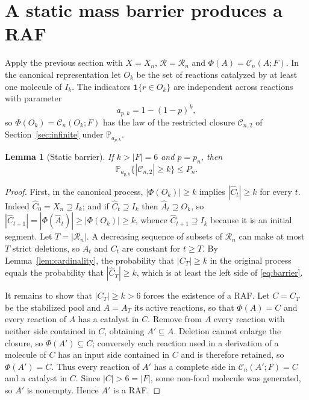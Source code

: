 \documentclass[11pt,reqno]{amsart}
\theoremstyle{plain}
\newtheorem{lemma}[theorem]{Lemma}
\theoremstyle{definition}
\theoremstyle{remark}
\numberwithin{equation}{section}
\newcommand{\Prob}{\mathbb{P}}
\newcommand{\cC}{\mathcal{C}}
\newcommand{\cR}{\mathcal{R}}
\begin{document}
\section{A static mass barrier produces a RAF}\label{sec:barrier}

Apply the previous section with $X=X_n$, $\cR=\cR_n$ and $\Phi(A)=\cC_n(A;F)$. In the canonical representation let $O_k$ be the set of reactions catalyzed by at least one molecule of $I_k$. The indicators $\mathbf 1\{r\in O_k\}$ are independent across reactions with parameter
\begin{equation}\label{eq:apk}
a_{p,k}=1-(1-p)^k,
\end{equation}
so $\Phi(O_k)=\cC_n(O_k;F)$ has the law of the restricted closure $\cC_{n,2}$ of Section~\ref{sec:infinite} under $\Prob_{a_{p,k}}$.

\begin{lemma}[Static barrier]\label{lem:barrier}
If $k>|F|=6$ and $p=p_n$, then
\begin{equation}\label{eq:barrier}
\Prob_{a_{p,k}}\{|\cC_{n,2}|\ge k\}\le P_n.
\end{equation}
\end{lemma}

\begin{proof}
First, in the canonical process, $|\Phi(O_k)|\ge k$ implies $|\widehat C_t|\ge k$ for every $t$. Indeed $\widehat C_0=X_n\supseteq I_k$; and if $\widehat C_t\supseteq I_k$ then $\widehat A_t\supseteq O_k$, so $|\widehat C_{t+1}|=|\Phi(\widehat A_t)|\ge|\Phi(O_k)|\ge k$, whence $\widehat C_{t+1}\supseteq I_k$ because it is an initial segment. Let $T=|\cR_n|$. A decreasing sequence of subsets of $\cR_n$ can make at most $T$ strict deletions, so $A_t$ and $C_t$ are constant for $t\ge T$. By Lemma~\ref{lem:cardinality}, the probability that $|C_T|\ge k$ in the original process equals the probability that $|\widehat C_T|\ge k$, which is at least the left side of \eqref{eq:barrier}.

It remains to show that $|C_T|\ge k>6$ forces the existence of a RAF. Let $C=C_T$ be the stabilized pool and $A=A_T$ its active reactions, so that $\Phi(A)=C$ and every reaction of $A$ has a catalyst in $C$. Remove from $A$ every reaction with neither side contained in $C$, obtaining $A'\subseteq A$. Deletion cannot enlarge the closure, so $\Phi(A')\subseteq C$; conversely each reaction used in a derivation of a molecule of $C$ has an input side contained in $C$ and is therefore retained, so $\Phi(A')=C$. Thus every reaction of $A'$ has a complete side in $\cC_n(A';F)=C$ and a catalyst in $C$. Since $|C|>6=|F|$, some non-food molecule was generated, so $A'$ is nonempty. Hence $A'$ is a RAF.
\end{proof}
\end{document}
